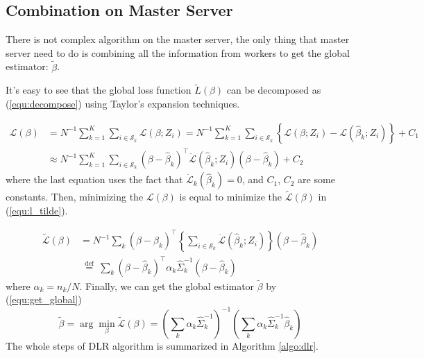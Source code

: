 \documentclass[11pt,en,authoryear]{elegantpaper}
\numberwithin{equation}{section}
\begin{document}
\subsection{Combination on Master Server}
There is not complex algorithm on the master server, the only thing that master server need to do is combining all the information from workers to get the global estimator: $\tilde{\beta}$.

It's easy to see that the global loss function $\tilde{L}(\beta)$ can be decomposed as (\ref{equ:decompose}) using Taylor’s expansion techniques.

\begin{equation}\label{equ:decompose}
\begin{aligned}
\mathcal{L}(\beta) &=N^{-1} \sum_{k=1}^{K} \sum_{i \in \mathcal{S}_{k}} \mathcal{L}\left(\beta ; Z_{i}\right)=N^{-1} \sum_{k=1}^{K} \sum_{i \in \mathcal{S}_{k}}\left\{\mathcal{L}\left(\beta ; Z_{i}\right)-\mathcal{L}\left(\widehat{\beta}_{k} ; Z_{i}\right)\right\}+C_{1} \\
& \approx N^{-1} \sum_{k=1}^{K} \sum_{i \in \mathcal{S}_{k}}\left(\beta-\widehat{\beta}_{k}\right)^{\top} \ddot{\mathcal{L}}\left(\widehat{\beta}_{k} ; Z_{i}\right)\left(\beta-\widehat{\beta}_{k}\right)+C_{2}
\end{aligned}
\end{equation}
where the last equation uses the fact that $\dot{\mathcal{L}}_{k}\left(\widehat{\beta}_{k}\right)=0$, and $C_1$, $C_2$ are some constants. Then, minimizing the $\mathcal{L}(\beta)$ is equal to minimize the $\widetilde{\mathcal{L}}(\beta)$ in (\ref{equ:l_tilde}).

\begin{equation}\label{equ:l_tilde}
\begin{aligned}
\widetilde{\mathcal{L}}(\beta) &=N^{-1} \sum_{k}\left(\beta-\widehat{\beta}_{k}\right)^{\top}\left\{\sum_{i \in \mathcal{S}_{k}} \ddot{\mathcal{L}}\left(\widehat{\beta}_{k} ; Z_{i}\right)\right\}\left(\beta-\widehat{\beta}_{k}\right) \\
& \stackrel{\text { def }}{=} \sum_{k}\left(\beta-\widehat{\beta}_{k}\right)^{\top} \alpha_{k} \widehat{\Sigma}_{k}^{-1}\left(\beta-\widehat{\beta}_{k}\right)
\end{aligned}
\end{equation}
where $\alpha_k = n_k /N$. Finally, we can get the global estimator $\tilde{\beta}$ by (\ref{equ:get_global})
\begin{equation}\label{equ:get_global}
\tilde{\beta}=\arg \min _{\beta} \widetilde{\mathcal{L}}(\beta)=\left(\sum_{k} \alpha_{k} \widehat{\Sigma}_{k}^{-1}\right)^{-1}\left(\sum_{k} \alpha_{k} \widehat{\Sigma}_{k}^{-1} \widehat{\beta}_{k}\right)
\end{equation}
The whole steps of DLR algorithm is summarized in Algorithm \ref{algo:dlr}.
\end{document}
